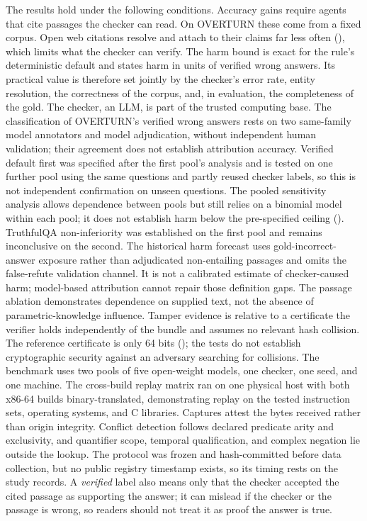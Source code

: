 The results hold under the following conditions. Accuracy gains require agents that cite passages the checker can read. On OVERTURN these come from a fixed corpus. Open web citations resolve and attach to their claims far less often (), which limits what the checker can verify. The harm bound is exact for the rule's deterministic default and states harm in units of verified wrong answers. Its practical value is therefore set jointly by the checker's error rate, entity resolution, the correctness of the corpus, and, in evaluation, the completeness of the gold. The checker, an LLM, is part of the trusted computing base. The classification of OVERTURN's verified wrong answers rests on two same-family model annotators and model adjudication, without independent human validation; their agreement does not establish attribution accuracy. Verified default first was specified after the first pool's analysis and is tested on one further pool using the same questions and partly reused checker labels, so this is not independent confirmation on unseen questions. The pooled sensitivity analysis allows dependence between pools but still relies on a binomial model within each pool; it does not establish harm below the pre-specified ceiling (). TruthfulQA non-inferiority was established on the first pool and remains inconclusive on the second. The historical harm forecast uses gold-incorrect-answer exposure rather than adjudicated non-entailing passages and omits the false-refute validation channel. It is not a calibrated estimate of checker-caused harm; model-based attribution cannot repair those definition gaps. The passage ablation demonstrates dependence on supplied text, not the absence of parametric-knowledge influence. Tamper evidence is relative to a certificate the verifier holds independently of the bundle and assumes no relevant hash collision. The reference certificate is only 64 bits (); the tests do not establish cryptographic security against an adversary searching for collisions. The benchmark uses two pools of five open-weight models, one checker, one seed, and one machine. The cross-build replay matrix ran on one physical host with both x86-64 builds binary-translated, demonstrating replay on the tested instruction sets, operating systems, and C libraries. Captures attest the bytes received rather than origin integrity. Conflict detection follows declared predicate arity and exclusivity, and quantifier scope, temporal qualification, and complex negation lie outside the lookup. The protocol was frozen and hash-committed before data collection, but no public registry timestamp exists, so its timing rests on the study records. A \emph{verified} label also means only that the checker accepted the cited passage as supporting the answer; it can mislead if the checker or the passage is wrong, so readers should not treat it as proof the answer is true.

